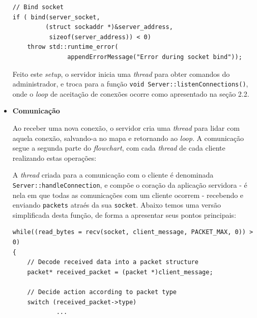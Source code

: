 \documentclass{article}
\begin{document}
\begin{itemize}
\begin{lstlisting}[xleftmargin=-.1\textwidth, xrightmargin=-.1\textwidth]
// Bind socket
if ( bind(server_socket, 
         (struct sockaddr *)&server_address, 
          sizeof(server_address)) < 0)
    throw std::runtime_error(
               appendErrorMessage("Error during socket bind"));
\end{lstlisting}
Feito este \textit{setup}, o servidor inicia uma \textit{thread} para obter comandos do administrador, e troca para a função \texttt{void Server::listenConnections()}, onde o \textit{loop} de aceitação de conexões ocorre como apresentado na seção 2.2.
\item \textbf{Comunicação}
\par Ao receber uma nova conexão, o servidor cria uma \textit{thread} para lidar com aquela conexão, salvando-a no mapa e retornando ao \textit{loop}. A comunicação segue a segunda parte do \textit{flowchart}, com cada \textit{thread} de cada cliente realizando estas operações:
\begin{center}
\end{center}%
A \textit{thread} criada para a comunicação com o cliente é denominada \texttt{Server::handleConnection}, e compõe o coração da aplicação servidora - é nela em que todas as comunicações com um cliente ocorrem - recebendo e enviando \texttt{packets} atraés da sua \texttt{socket}. Abaixo temos uma versão simplificada desta função, de forma a apresentar seus pontos principais:
\\
\begin{lstlisting}[xleftmargin=-.2\textwidth, xrightmargin=-.2\textwidth]
while((read_bytes = recv(socket, client_message, PACKET_MAX, 0)) > 0)
{
    // Decode received data into a packet structure
    packet* received_packet = (packet *)client_message;

    // Decide action according to packet type
    switch (received_packet->type)
            ...


\end{lstlisting}
\end{itemize}
\end{document}
